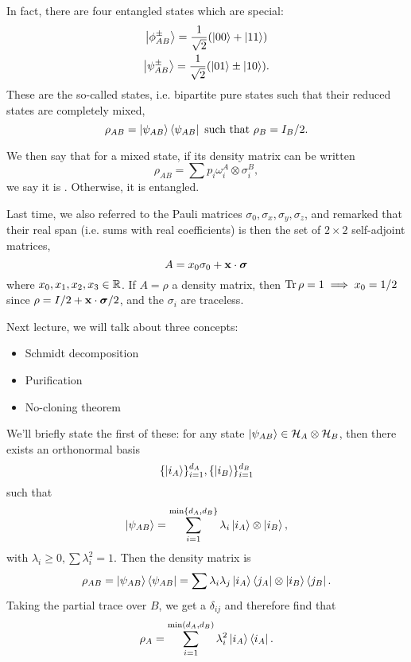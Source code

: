 In fact, there are four entangled states which are special:
\begin{gather}
    \left| \phi^\pm_{AB} \right>=\frac{1}{\sqrt{2}}(\left| 00 \right>+\left| 11 \right>)\\
    \left| \psi^\pm_{AB} \right> = \frac{1}{\sqrt{2}}(\left| 01 \right>\pm \left| 10 \right>).
\end{gather}
These are the so-called  states, i.e. bipartite pure states such that their reduced states are completely mixed,
\begin{equation}
    \rho_{AB}=\left| \psi_{AB} \right>\left< \psi_{AB} \right|\text{ such that }\rho_B=I_B/2.
\end{equation}

We then say that for a mixed state, if its density matrix can be written
\begin{equation}
    \rho_{AB} = \sum p_i \omega_i^A \otimes \sigma_i^B,
\end{equation}
we say it is . Otherwise, it is entangled.

Last time, we also referred to the Pauli matrices $\sigma_0,\sigma_x,\sigma_y,\sigma_z$, and remarked that their real span (i.e. sums with real coefficients) is then the set of $2\times 2$ self-adjoint matrices,
\begin{equation*}
    A=x_0\sigma_0 +\boldsymbol{\mathbf{x}} \cdot \mbox{\boldmath$ \sigma $}
\end{equation*}
where $x_0,x_1,x_2,x_3\in \mathbb{R}$. If $A=\rho$ a density matrix, then $\operatorname{Tr} \rho=1 \implies x_0=1/2$ since $\rho=I/2 + \boldsymbol{\mathbf{x}} \cdot \mbox{\boldmath$ \sigma $}/2$, and the $\sigma_i$ are traceless.

Next lecture, we will talk about three concepts:
\begin{itemize}
    \item Schmidt decomposition
    \item Purification
    \item No-cloning theorem
\end{itemize}
We'll briefly state the first of these: for any state $\left| \psi_{AB} \right>\in \mathcal H_A \otimes \mathcal H_B$, then there exists an orthonormal basis
\begin{equation}
    \{\left| i_A \right>\}_{i=1}^{d_A},\{\left| i_B \right>\}_{i=1}^{d_B}
\end{equation}
such that
\begin{equation}
    \left| \psi_{AB} \right>=\sum_{i=1}^{\min\{d_A,d_B\}}\lambda_i \left| i_A \right>\otimes \left| i_B \right>,
\end{equation}
with $\lambda_i \geq 0, \sum \lambda_i^2 = 1$. Then the density matrix is
\begin{equation}
    \rho_{AB}=\left| \psi_{AB} \right>\left< \psi_{AB} \right| = \sum \lambda_i \lambda_j \left| i_A \right>\left< j_A \right|\otimes \left| i_B \right> \left< j_B \right|.
\end{equation}
Taking the partial trace over $B$, we get a $\delta_{ij}$ and therefore find that
\begin{equation}
    \rho_A= \sum_{i=1}^{\min(d_A,d_B)} \lambda_i^2 \left| i_A \right>\left< i_A \right|.
\end{equation}
